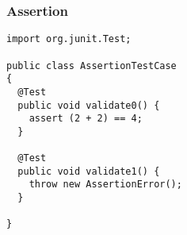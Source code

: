 \begin{frame}[fragile, hasprev=false, hasnext=false]
\frametitle{Assertion}
\label{example:junit-raw-assertion}

\begin{lstlisting}
import org.junit.Test;

public class AssertionTestCase
{
  @Test
  public void validate0() {
    assert (2 + 2) == 4;
  }

  @Test
  public void validate1() {
    throw new AssertionError();
  }

}
\end{lstlisting}
\end{frame}